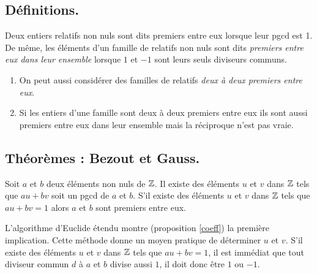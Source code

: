 \begin{propn}
\subsection{Définitions.}
\begin{defi}
 Deux entiers relatifs non nuls sont dits premiers entre eux lorsque leur pgcd est 1. De même, les éléments d'un famille de relatifs non nuls sont dits \emph{ premiers entre eux dans leur ensemble}  lorsque $1$ et $-1$ sont leurs seuls diviseurs communs.
\end{defi}
\begin{rems}
\begin{enumerate}
 \item On peut aussi considérer des familles de relatifs \emph{deux à deux premiers entre eux}.
 \item Si les entiers d'une famille sont deux à deux premiers entre eux ils sont aussi premiers entre eux dans leur ensemble mais la réciproque n'est pas vraie.
\end{enumerate}
 \end{rems}

\subsection{Théorèmes : Bezout et Gauss.}
\begin{thm}[de Bezout]
 Soit $a$ et $b$ deux éléments non nuls de $\mathbb{Z}$.\newline
Il existe des éléments $u$ et $v$ dans $\mathbb{Z}$ tels que $au+bv$ soit un pgcd de $a$ et $b$. S'il existe des éléments $u$ et $v$ dans $\mathbb{Z}$ tels que $au+bv=1$ alors $a$ et $b$ sont premiers entre eux.
\end{thm}
\begin{demo}
 L'algorithme d'Euclide étendu montre (proposition \ref{coeff}) la première implication. Cette méthode donne un moyen pratique de déterminer $u$ et $v$.\newline
 S'il existe des éléments $u$ et $v$ dans $\mathbb{Z}$ tels que $au+bv=1$, il est immédiat que tout diviseur commun $d$ à $a$ et $b$ divise aussi $1$, il doit donc être $1$ ou $-1$.
\end{demo}


\end{propn}
